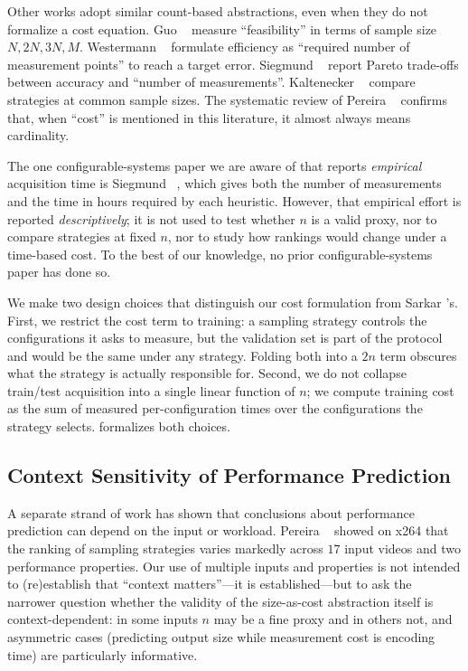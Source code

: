 Other works adopt similar count-based abstractions, even when they do not
formalize a cost equation. Guo \etal~\cite{guo2013ASE} measure ``feasibility''
in terms of sample size $N,2N,3N,M$. Westermann \etal~\cite{westermann2012}
formulate efficiency as ``required number of measurement points'' to reach a
target error. Siegmund \etal~\cite{siegmund2015FSE} report Pareto trade-offs
between accuracy and ``number of measurements''. Kaltenecker
\etal~\cite{kaltenecker2019} compare strategies at common sample sizes. The
systematic review of Pereira \etal~\cite{julianasurvey} confirms that, when
``cost'' is mentioned in this literature, it almost always means cardinality.

The one configurable-systems paper we are aware of that reports
\emph{empirical} acquisition time is Siegmund \etal~\cite{siegmund2012a}, which
gives both the number of measurements and the time in hours required by each
heuristic. However, that empirical effort is reported \emph{descriptively}; it
is not used to test whether $n$ is a valid proxy, nor to compare strategies at
fixed $n$, nor to study how rankings would change under a time-based
cost. To the best of our knowledge, no prior configurable-systems paper has
done so.

We make two design choices that distinguish our cost formulation from
Sarkar \etal's. First, we restrict the cost term to training: a sampling
strategy controls the configurations it asks to measure, but the validation
set is part of the protocol and would be the same under any strategy. Folding
both into a $2n$ term obscures what the strategy is actually responsible
for. Second, we do not collapse train/test acquisition into a single linear
function of $n$; we compute training cost as the sum of measured
per-configuration times over the configurations the strategy
selects.  formalizes both choices.

\subsection{Context Sensitivity of Performance Prediction}
\label{subsec:context-sensitivity}

A separate strand of work has shown that conclusions about performance
prediction can depend on the input or workload. Pereira
\etal~\cite{pereira2020} showed on x264 that the ranking of sampling
strategies varies markedly across $17$ input videos and two performance
properties.  Our use of multiple inputs and properties is not
intended to (re)establish that ``context matters''---it is established---but to
ask the narrower question whether the validity of the size-as-cost abstraction
itself is context-dependent: in some inputs $n$ may be a fine proxy and in
others not, and asymmetric cases (predicting output size while measurement
cost is encoding time) are particularly informative.
